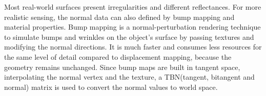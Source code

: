 \documentclass[final,5p,times]{elsarticle}
\begin{document}
Most real-world surfaces present irregularities and different reflectances. For more realistic sensing, the normal data can also defined by bump mapping and material properties. Bump mapping is a normal-perturbation rendering technique to simulate bumps and wrinkles on the object's surface by passing textures and modifying the normal directions. It is much faster and consumes less resources for the same level of detail compared to displacement mapping, because the geometry remains unchanged. Since bump maps are built in tangent space, interpolating the normal vertex and the texture, a TBN(tangent, bitangent and normal) matrix is used to convert the normal values to world space.





\end{document}
